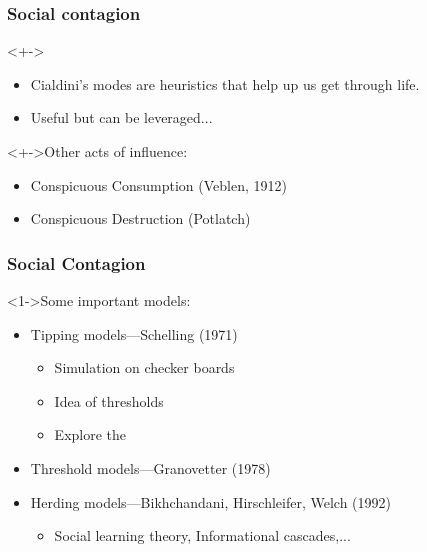 \begin{frame}
  \frametitle{Social contagion}

  \begin{block}<+->{}
    \begin{itemize}
    \item<+-> 
      Cialdini's modes are heuristics that help up us get through life.
    \item<+-> 
      Useful but can be leveraged...
    \end{itemize}
  \end{block}

  \begin{block}<+->{Other acts of influence:}
  \begin{itemize}
  \item<+-> 
    Conspicuous Consumption (Veblen, 1912)
  \item<+-> 
    Conspicuous Destruction (Potlatch)
  \end{itemize}
  \end{block}
  

\end{frame}


\begin{frame}
  \frametitle{Social Contagion}

  \begin{block}<1->{Some important models:}
    \begin{itemize}
    \item<1-> 
      Tipping models---Schelling (1971)\cite{schelling1971a,schelling1973a,schelling1978a}\\
      \begin{itemize}
      \item <2->
        Simulation on checker boards
      \item <3->
        Idea of thresholds
      \item <4->
        Explore the  
        \cite{wilensky1998a}
      \end{itemize}
    \item<5-> 
      Threshold models---Granovetter (1978)\cite{granovetter1978a}
    \item<6-> 
      Herding models---Bikhchandani, Hirschleifer, Welch (1992)\cite{bikhchandani1992a,bikhchandani1998a}
      \begin{itemize}
      \item<7->
        Social learning theory, Informational cascades,...
      \end{itemize}
    \end{itemize}
  \end{block}

\end{frame}


